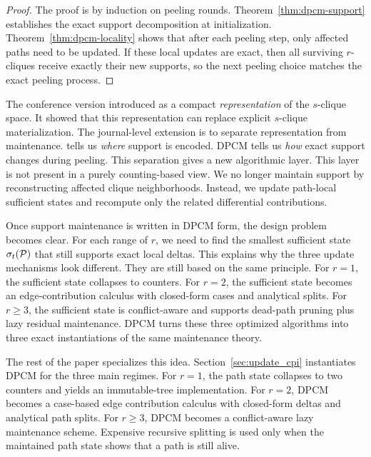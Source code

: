 \begin{proof}
The proof is by induction on peeling rounds.
%
Theorem~\ref{thm:dpcm-support} establishes the exact support decomposition at initialization.
%
Theorem~\ref{thm:dpcm-locality} shows that after each peeling step, only affected paths need to be updated.
%
If these local updates are exact, then all surviving $r$-cliques receive exactly their new supports, so the next peeling choice matches the exact peeling process.
\end{proof}

The conference version introduced \cpi as a compact \emph{representation} of the $s$-clique space.
%
It showed that this representation can replace explicit $s$-clique materialization.
%
The journal-level extension is to separate representation from maintenance.
%
\cpi tells us \emph{where} support is encoded.
%
DPCM tells us \emph{how} exact support changes during peeling.
%
This separation gives a new algorithmic layer.
%
This layer is not present in a purely counting-based view.
%
We no longer maintain support by reconstructing affected clique neighborhoods.
%
Instead, we update path-local sufficient states and recompute only the related differential contributions.

Once support maintenance is written in DPCM form, the design problem becomes clear.
%
For each range of $r$, we need to find the smallest sufficient state $\sigma_t(\TPath)$ that still supports exact local deltas.
%
This explains why the three update mechanisms look different.
%
They are still based on the same principle.
%
For $r{=}1$, the sufficient state collapses to counters.
%
For $r{=}2$, the sufficient state becomes an edge-contribution calculus with closed-form cases and analytical splits.
%
For $r{\ge}3$, the sufficient state is conflict-aware and supports dead-path pruning plus lazy residual maintenance.
%
DPCM turns these three optimized algorithms into three exact instantiations of the same maintenance theory.

The rest of the paper specializes this idea.
%
Section~\ref{sec:update_cpi} instantiates DPCM for the three main regimes.
%
For $r{=}1$, the path state collapses to two counters and yields an immutable-tree implementation.
%
For $r{=}2$, DPCM becomes a case-based edge contribution calculus with closed-form deltas and analytical path splits.
%
For $r{\ge}3$, DPCM becomes a conflict-aware lazy maintenance scheme.
%
Expensive recursive splitting is used only when the maintained path state shows that a path is still alive.
